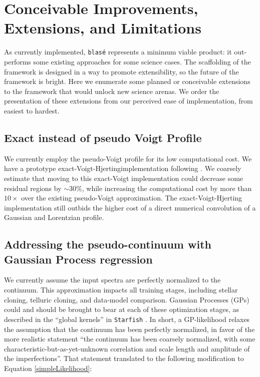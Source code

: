 \documentclass[modern]{aastex631}
\begin{document}
\section{Conceivable Improvements, Extensions, and Limitations}

As currently implemented, \texttt{blas\'e} represents a minimum viable product: it out-performs some existing approaches for some science cases.  The scaffolding of the framework is designed in a way to promote extensibility, so the future of the framework is bright.  Here we enumerate some planned or conceivable extensions to the framework that would unlock new science arenas.  We order the presentation of these extensions from our perceived ease of implementation, from easiest to hardest.

\subsection{Exact instead of pseudo Voigt Profile}
We currently employ the pseudo-Voigt profile for its low computational cost.  We have a prototype exact-Voigt-Hjertingimplementation following \citet{2022ApJS..258...31K}.  We coarsely estimate that moving to this exact-Voigt implementation could decrease some residual regions by $\sim 30\%$, while increasing the computational cost by more than $10\times$ over the existing pseudo-Voigt approximation.  The exact-Voigt-Hjerting implementation still outbids the higher cost of a direct numerical convolution of a Gaussian and Lorentzian profile.



\subsection{Addressing the pseudo-continuum with Gaussian Process regression}

We currently assume the input spectra are perfectly normalized to the continuum.  This approximation impacts all training stages, including stellar cloning, telluric cloning, and data-model comparison.  Gaussian Processes (GPs) could and should be brought to bear at each of these optimization stages, as described in the ``global kernels'' in \texttt{Starfish} \citet{czekala15}.  In short, a GP-likelihood relaxes the assumption that the continuum has been perfectly normalized, in favor of the more realistic statement ``the continuum has been coarsely normalized, with some characteristic-but-as-yet-unknown correlation and scale length and amplitude of the imperfections''.  That statement translated to the following modification to Equation \ref{simpleLikelihood}:
\end{document}
